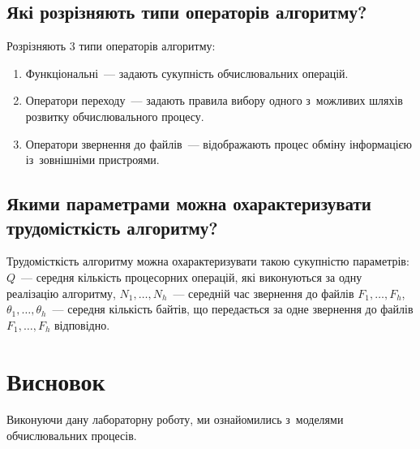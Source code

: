 \documentclass[
	a4paper,
	oneside,
	BCOR = 10mm,
	DIV = 12,
	12pt,
	headings = normal,
]{scrartcl}
\begin{document}
		\subsection{Які розрізняють типи операторів алгоритму?}
			Розрізняють 3 типи операторів алгоритму: 
			\begin{enumerate}[itemsep = 1\baselineskip]
				\item Функціональні~— задають сукупність обчислювальних операцій. 
				\item Оператори переходу~— задають правила вибору одного з~можливих шляхів розвитку обчислювального процесу. 
				\item Оператори звернення до файлів~— відображають процес обміну інформацією із~зовнішніми пристроями. 
			\end{enumerate}

		\subsection{Якими параметрами можна охарактеризувати трудомісткість алгоритму?}
			Трудомісткість алгоритму можна охарактеризувати такою сукупністю параметрів: $Q$~— середня кількість процесорних операцій, які виконуються за одну реалізацію алгоритму, $N_1, \dots, N_{h}$~— середній час звернення до файлів $F_{1}, \dots, F_{h}$, $\theta_1, \dots, \theta_{h}$~— середня кількість байтів, що передається за одне звернення до файлів $F_{1}, \dots, F_{h}$ відповідно. 


	\section{Висновок}
		Виконуючи дану лабораторну роботу, ми ознайомились з~моделями обчислювальних процесів. 
\end{document}
